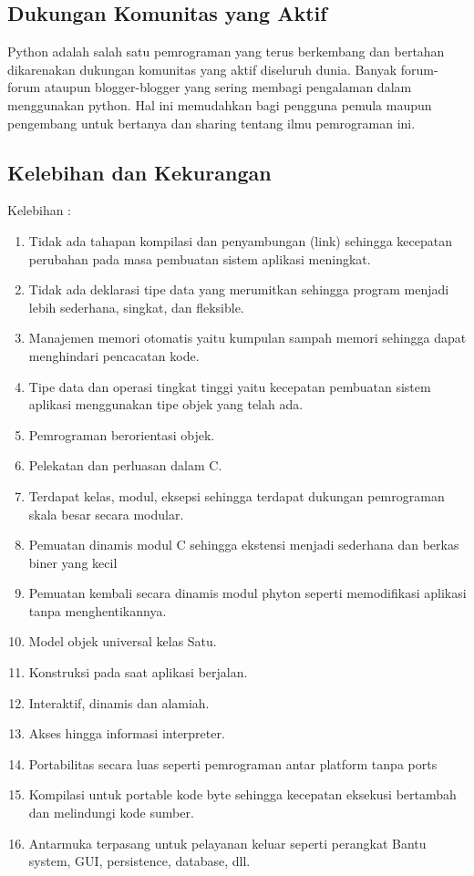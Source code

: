 \subsection{Dukungan Komunitas yang Aktif}
Python adalah salah satu pemrograman yang terus berkembang dan bertahan dikarenakan dukungan komunitas yang aktif diseluruh dunia. Banyak forum-forum ataupun blogger-blogger yang sering membagi pengalaman dalam menggunakan python. Hal ini memudahkan bagi pengguna pemula maupun pengembang untuk bertanya dan sharing tentang ilmu pemrograman ini.

\subsection{Kelebihan dan Kekurangan}
Kelebihan :
\begin{enumerate}
\item Tidak ada tahapan kompilasi dan penyambungan (link) sehingga kecepatan perubahan pada masa pembuatan sistem aplikasi meningkat.
\item Tidak ada deklarasi tipe data yang merumitkan sehingga program menjadi lebih sederhana, singkat, dan fleksible.
\item Manajemen memori otomatis yaitu kumpulan sampah memori sehingga dapat menghindari pencacatan kode.
\item Tipe data dan operasi tingkat tinggi yaitu kecepatan pembuatan sistem aplikasi menggunakan tipe objek yang telah ada.
\item Pemrograman berorientasi objek.
\item Pelekatan dan perluasan dalam C.
\item Terdapat kelas, modul, eksepsi sehingga terdapat dukungan pemrograman skala besar secara modular.
\item Pemuatan dinamis modul C sehingga ekstensi menjadi sederhana dan berkas biner yang kecil
\item Pemuatan kembali secara dinamis modul phyton seperti memodifikasi aplikasi tanpa menghentikannya.
\item Model objek universal kelas Satu.
\item Konstruksi pada saat aplikasi berjalan.
\item Interaktif, dinamis dan alamiah.
\item Akses hingga informasi interpreter.
\item Portabilitas secara luas seperti pemrograman antar platform tanpa ports
\item Kompilasi untuk portable kode byte sehingga kecepatan eksekusi bertambah dan melindungi kode sumber.
\item Antarmuka terpasang untuk pelayanan keluar seperti perangkat Bantu system, GUI, persistence, database, dll.
\end{enumerate}

